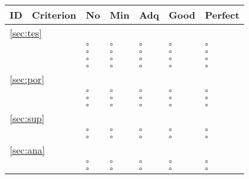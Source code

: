 \documentclass[a4paper,11pt]{article}
\begin{document}
\begin{table}[hbt]
	\begin{tabular}
		{ p{} | 
		  p{} |
		  p{} |
		  p{} |
		  p{} |
		  p{} |
		  p{} }
        \hline
		\textbf{ID} & \textbf{Criterion} & \textbf{No} & \textbf{Min} & \textbf{Adq} & \textbf{Good} & \textbf{Perfect} \\
        \hline 
        		\multicolumn{7}{l}{\ref{sec:tes}{ }\nameref{sec:tes}} \\
		\hline
		\hyperref[id:ts1]{\tsOneID} & \tsOneText & $\square$ & $\square$ & $\square$ & $\square$ & $\square$ \\
		\hyperref[id:ts2]{\tsTwoID} & \tsTwoText & $\square$ & $\square$ & $\square$ & $\square$ & $\square$ \\
		\hyperref[id:ts3]{\tsThreeID} & \tsThreeText & $\square$ & $\square$ & $\square$ & $\square$ & $\square$ \\
		\hyperref[id:ts4]{\tsFourID} & \tsFourText & $\square$ & $\square$ & $\square$ & $\square$ & $\square$ \\
		\hline
        \multicolumn{7}{l}{\ref{sec:por}{ }\nameref{sec:por}} \\
		\hline	
		\hyperref[id:pb1]{\pbOneID} & \pbOneText & $\square$ & $\square$ & $\square$ & $\square$ & $\square$ \\
		\hyperref[id:pb2]{\pbTwoID} & \pbTwoText & $\square$ & $\square$ & $\square$ & $\square$ & $\square$ \\
		\hyperref[id:pb3]{\pbThreeID} & \pbThreeText & $\square$ & $\square$ & $\square$ & $\square$ & $\square$ \\
		\hline	
		\multicolumn{7}{l}{\ref{sec:sup}{ }\nameref{sec:sup}} \\
		\hline	
		\hyperref[id:sp1]{\spOneID} & \spOneText & $\square$ & $\square$ & $\square$ & $\square$ & $\square$ \\
		\hyperref[id:sp2]{\spTwoID} & \spTwoText & $\square$ & $\square$ & $\square$ & $\square$ & $\square$ \\
		\hline
		\multicolumn{7}{l}{\ref{sec:ana}{ }\nameref{sec:ana}} \\
		\hline	
		\hyperref[id:an1]{\anOneID} & \anOneText & $\square$ & $\square$ & $\square$ & $\square$ & $\square$ \\
		\hyperref[id:an2]{\anTwoID} & \anTwoText & $\square$ & $\square$ & $\square$ & $\square$ & $\square$ \\

\end{tabular}
\end{table}
\end{document}
